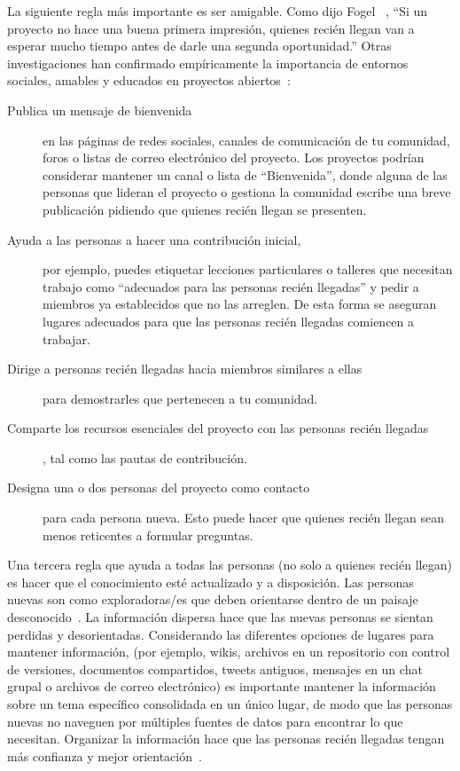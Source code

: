 La siguiente regla más importante es ser amigable.
Como dijo Fogel ~\cite{Foge2005},
``Si un proyecto no hace una buena primera impresión,
quienes recién llegan van a esperar mucho tiempo antes de darle una segunda oportunidad.''
Otras investigaciones han confirmado empíricamente la importancia de entornos sociales, amables y educados
en proyectos abiertos~\cite{Sing2012,Stei2013,Stei2018}:

\begin{description}

\item[Publica un mensaje de bienvenida]
  en las páginas de redes sociales, canales de comunicación de tu comunidad, foros o listas de correo electrónico del proyecto.
  Los proyectos podrían considerar mantener un canal o lista de ``Bienvenida'',
  donde alguna de las personas que lideran el proyecto o gestiona la comunidad escribe una breve publicación pidiendo que quienes recién llegan se presenten.

\item[Ayuda a las personas a hacer una contribución inicial,]
por ejemplo, puedes etiquetar lecciones particulares o talleres que necesitan trabajo como ``adecuados para las personas recién llegadas''
  y pedir a miembros ya establecidos que no las arreglen. De esta forma se aseguran
  lugares adecuados para que las personas recién llegadas comiencen a trabajar.

\item[Dirige a personas recién llegadas hacia miembros similares a ellas]
  para demostrarles que pertenecen a tu comunidad.

\item[Comparte los recursos esenciales del proyecto con las personas recién llegadas],
  tal como las pautas de contribución.

\item[Designa una o dos personas del proyecto como contacto]
  para cada persona nueva.
  Esto puede hacer que quienes recién llegan sean menos reticentes a formular preguntas.

\end{description}

Una tercera regla que ayuda a todas las personas (no solo a quienes recién llegan)
es hacer que el conocimiento esté actualizado y a disposición.
Las personas nuevas son como exploradoras/es que deben orientarse dentro de un paisaje desconocido~\cite{Dage2010}.
La información dispersa hace que las nuevas personas se sientan perdidas y desorientadas.
Considerando las diferentes opciones de lugares para mantener información, 
(por ejemplo, wikis, archivos en un repositorio con control de versiones, documentos compartidos, tweets antiguos, mensajes en un chat grupal o archivos de correo electrónico)
es importante mantener la información sobre un tema específico consolidada en un único lugar,
de modo que las personas nuevas no naveguen por múltiples fuentes de datos para encontrar lo que necesitan.
Organizar la información hace que las personas recién llegadas tengan más confianza y mejor orientación~\cite{Stei2016}.

